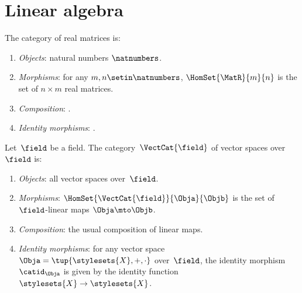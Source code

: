 

\section[Linear algebra]{Linear algebra}
\label{sec:cats-of-linear-algebra}

\begin{ctdefinition}
    \label{def:cat-of-real-matrices}
    The category \MatR of real matrices is:
    \begin{enumerate}
        \item \emph{Objects}: natural numbers $\natnumbers$.
        \item \emph{Morphisms}: for any $m, n \setin \natnumbers$, $\HomSet{\MatR}{m}{n}$ is the set  of $n \times m$ real matrices.
        \item \emph{Composition}: .
        \item \emph{Identity morphisms}: .
    \end{enumerate}
\end{ctdefinition}

\begin{ctdefinition}
    \label{def:cat-of-vector-spaces}
    \label{def:cat-of-real-vector-spaces}
    Let~$\field$ be a field.
    The category~$\VectCat{\field}$ of vector spaces over~$\field$ is:
    \begin{enumerate}
        \item \emph{Objects}: all vector spaces over~$\field$.
        \item \emph{Morphisms}: $\HomSet{\VectCat{\field}}{\Obja}{\Objb}$ is the set of $\field$-linear maps $\Obja \mto \Objb$.
        \item \emph{Composition}: the usual composition of linear maps.
        \item \emph{Identity morphisms}: for any vector space~$\Obja = \tup{\stylesets{X}, +,{{ \cdot}}}$ over~$\field$, the identity morphism $\catid_\Obja$ is given by the identity function $\stylesets{X} \to \stylesets{X}$.
    \end{enumerate}
\end{ctdefinition}

